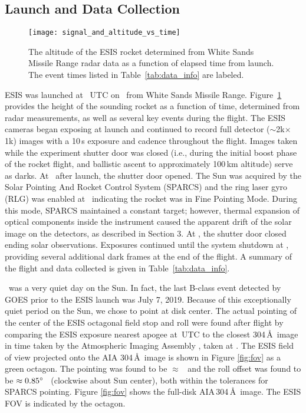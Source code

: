     
	\subsection{Launch and Data Collection} 
		\begin{figure}
			\begin{center}
				\texttt{[image: signal\_and\_altitude\_vs\_time]}
				\caption{The altitude of the ESIS rocket determined from White Sands Missile Range radar data as a function of elapsed time from launch.  The event times listed in Table~\ref{tab:data_info} are labeled.
				}
				\label{fig:timeline}
			\end{center}
		\end{figure}

		ESIS was launched at \timeMissionStart~UTC
		on \dateMission\ from White Sands Missile Range.  Figure~\ref{fig:timeline} provides the height of the sounding rocket as a function of time, determined from %
		radar measurements, as well as several key events during the flight.  
		The ESIS cameras began exposing at launch and continued to record full detector ($\sim$2k$\times$1k) images with a 10\,s exposure and cadence throughout the flight. Images taken while the
		experiment shutter door was closed (i.e., during the initial  boost phase of the rocket flight, and ballistic ascent to approximately 100\,km altitude) serve as darks.  
		At \timeMissionShutterOpen\ after launch, the shutter door %
		opened.  
		The Sun was acquired by the Solar Pointing And Rocket %
		Control System (SPARCS) and the ring laser gyro (RLG) was enabled at \timeMissionRlgEnable\ indicating the rocket was in Fine Pointing Mode.  
		During this mode, SPARCS maintained a constant target; however, thermal expansion of optical components inside the instrument caused the apparent drift of the solar image on the detectors, as described in Section 3.  
		At  \timeMissionShutterClose, the shutter door closed ending solar observations. Exposures continued until the system shutdown at \timeDataStop, providing several additional dark frames at the end of the flight.   A summary of the flight and data collected is given in Table~\ref{tab:data_info}.
		
	    \dateMission\ was a very quiet day on the Sun.  
	    In fact, the last  B-class event detected by GOES \citep{GOES} prior to the ESIS launch was July 7, 2019.  Because of this exceptionally quiet period on the Sun, we chose to point at disk center. 
	    The actual pointing of the center of the ESIS octagonal field stop and roll were found after flight by comparing the ESIS exposure nearest apogee at \timeApogeeFrame\,UTC to the closest 304\,\AA \ image in time taken by the Atmospheric Imaging Assembly \citep[AIA][]{Lemen2012}, taken at \aianearapogee.  
	    The ESIS field of view projected onto the AIA 304\,\AA\ image is shown in Figure \ref{fig:fov} as a green octagon.  
	    The pointing was found to be $\approx$ \esispointing \ and the roll offset was found to be $\approx 0.85^{\circ}$ \ (clockwise about Sun center), both within the tolerances for SPARCS pointing.  
	    Figure \ref{fig:fov} shows the full-disk AIA\,304\,\AA\ image. 
	    The ESIS FOV is indicated by the octagon.  
	    
